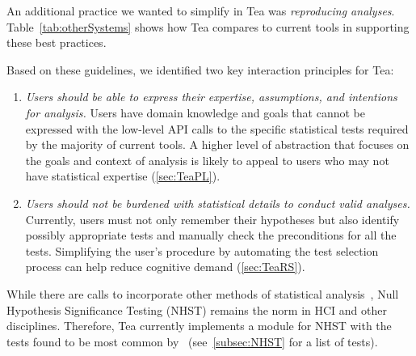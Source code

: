 An additional practice we wanted to simplify in Tea was \textit{reproducing analyses}. Table~\ref{tab:otherSystems} shows how Tea compares to current tools in supporting these best practices.


Based on these guidelines, we identified two key interaction principles for Tea: 
\begin{enumerate}
    \item \textit{Users should be able to express their expertise, assumptions,
    and intentions for analysis.} Users have domain knowledge and goals
    that cannot be expressed with the low-level API calls to the specific
    statistical tests required by the majority of current tools. A higher level
    of abstraction that focuses on the goals and context of analysis is
    likely to appeal to users who may not have statistical expertise (\autoref{sec:TeaPL}).
    \item \textit{Users should not be burdened with statistical details to
    conduct valid analyses.} Currently, users must not only remember their hypotheses but
    also identify possibly appropriate tests and manually check the
    preconditions for all the tests. %
    Simplifying the user's procedure by automating the test selection process
    can help reduce cognitive demand (\autoref{sec:TeaRS}).
\end{enumerate}

While there are calls to incorporate other methods of statistical
analysis~\cite{kay2016researcher,kaptein2012rethinking}, Null
Hypothesis Significance Testing (NHST) remains the norm in HCI and
other disciplines. Therefore, Tea currently implements a module for
NHST with the tests found to be most common
by~\cite{wacharamanotham2015statsplorer} (see~\autoref{subsec:NHST} for a list of tests).
